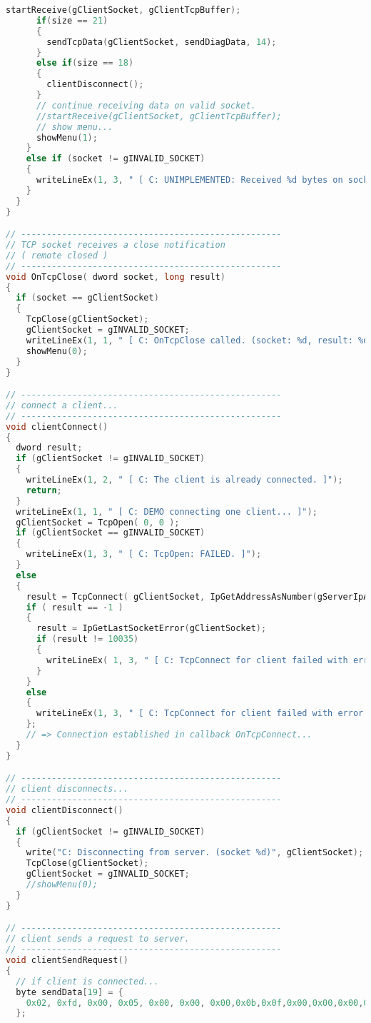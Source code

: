 \begin{lstlisting}[language=C]
      startReceive(gClientSocket, gClientTcpBuffer);
      if(size == 21)
      {
        sendTcpData(gClientSocket, sendDiagData, 14);
      }
      else if(size == 18)
      {
        clientDisconnect();
      }
      // continue receiving data on valid socket.
      //startReceive(gClientSocket, gClientTcpBuffer);
      // show menu...
      showMenu(1);
    }
    else if (socket != gINVALID_SOCKET)
    {
      writeLineEx(1, 3, " [ C: UNIMPLEMENTED: Received %d bytes on socket %d from 0x%x:%d with data: %s (result: %d) ]", size, socket, address, port, buffer, result);
    }
  }
}

// ---------------------------------------------------
// TCP socket receives a close notification
// ( remote closed )
// ---------------------------------------------------
void OnTcpClose( dword socket, long result)
{
  if (socket == gClientSocket)
  {
    TcpClose(gClientSocket);
    gClientSocket = gINVALID_SOCKET;
    writeLineEx(1, 1, " [ C: OnTcpClose called. (socket: %d, result: %d) ]", socket, result);
    showMenu(0);
  }
}

// ---------------------------------------------------
// connect a client...
// ---------------------------------------------------
void clientConnect()
{
  dword result;
  if (gClientSocket != gINVALID_SOCKET)
  {
    writeLineEx(1, 2, " [ C: The client is already connected. ]");
    return;
  }
  writeLineEx(1, 1, " [ C: DEMO connecting one client... ]");
  gClientSocket = TcpOpen( 0, 0 );
  if (gClientSocket == gINVALID_SOCKET)
  {
    writeLineEx(1, 3, " [ C: TcpOpen: FAILED. ]");
  }
  else
  {
    result = TcpConnect( gClientSocket, IpGetAddressAsNumber(gServerIpAddrStr), gListenPort );
    if ( result == -1 )
    {
      result = IpGetLastSocketError(gClientSocket);
      if (result != 10035)
      {
        writeLineEx( 1, 3, " [ C: TcpConnect for client failed with error %d ]", result );
      }
    }
    else
    {
      writeLineEx(1, 3, " [ C: TcpConnect for client failed with error %d ]", result);
    };
    // => Connection established in callback OnTcpConnect...
  }
}

// ---------------------------------------------------
// client disconnects...
// ---------------------------------------------------
void clientDisconnect()
{
  if (gClientSocket != gINVALID_SOCKET)
  {
    write("C: Disconnecting from server. (socket %d)", gClientSocket);
    TcpClose(gClientSocket);
    gClientSocket = gINVALID_SOCKET;
    //showMenu(0);
  }
}

// ---------------------------------------------------
// client sends a request to server.
// ---------------------------------------------------
void clientSendRequest()
{
  // if client is connected...
  byte sendData[19] = {
    0x02, 0xfd, 0x00, 0x05, 0x00, 0x00, 0x00,0x0b,0x0f,0x00,0x00,0x00,0x00,0x00,0x00,0x00,0x00,0x00,0x00
  };
  

\end{lstlisting}
